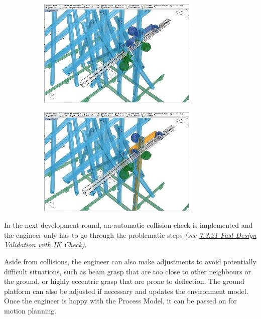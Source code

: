 \documentclass[11pt]{book}
\begin{document}
\begin{figure}[H]
\centering
\begin{subfigure}[b]{0.45\textwidth}
\centering
\includegraphics[width=\textwidth]{./images/image54.jpeg}
\end{subfigure}
\hfill
\begin{subfigure}[b]{0.45\textwidth}
\centering
\includegraphics[width=\textwidth]{./images/image55.jpeg}
\end{subfigure}
\end{figure}


In the next development round, an automatic collision check is implemented and the engineer only has to go through the problematic steps \textit{\textcolor[HTML]{B7B7B7}{(see \uline{7.3.21 Fast Design Validation with IK Check})}}.

Aside from collisions, the engineer can also make adjustments to avoid potentially difficult situations, such as beam grasp that are too close to other neighbours or the ground, or highly eccentric grasp that are prone to deflection. The ground platform can also be adjusted if necessary and updates the environment model. Once the engineer is happy with the Process Model, it can be passed on for motion planning. 
\end{document}
